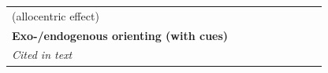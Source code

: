 \documentclass[11pt,]{memoir}
\begin{document}
\begin{longtable}[]{@{}lllllllll@{}}
\begin{minipage}[t]{0.24\columnwidth}
(allocentric effect)\strut
\end{minipage}\tabularnewline
\begin{minipage}[t]{0.12\columnwidth}\raggedright
\textbf{Exo-/endogenous orienting
(with cues)}\strut
\end{minipage} & \begin{minipage}[t]{0.02\columnwidth}\raggedright
\strut
\end{minipage} & \begin{minipage}[t]{0.04\columnwidth}\raggedright
\strut
\end{minipage} & \begin{minipage}[t]{0.11\columnwidth}\raggedright
\strut
\end{minipage} & \begin{minipage}[t]{0.03\columnwidth}\raggedright
\strut
\end{minipage} & \begin{minipage}[t]{0.05\columnwidth}\raggedright
\strut
\end{minipage} & \begin{minipage}[t]{0.05\columnwidth}\raggedright
\strut
\end{minipage} & \begin{minipage}[t]{0.11\columnwidth}\raggedright
\strut
\end{minipage} & \begin{minipage}[t]{0.24\columnwidth}\raggedright
\strut
\end{minipage}\tabularnewline
\begin{minipage}[t]{0.12\columnwidth}\raggedright
\emph{Cited in text}\strut
\end{minipage} & \begin{minipage}[t]{0.02\columnwidth}\raggedright
\strut
\end{minipage} & \begin{minipage}[t]{0.04\columnwidth}\raggedright
\strut
\end{minipage} & \begin{minipage}[t]{0.11\columnwidth}\raggedright
\strut
\end{minipage} & \begin{minipage}[t]{0.03\columnwidth}\raggedright
\strut
\end{minipage} & \begin{minipage}[t]{0.05\columnwidth}\raggedright
\strut
\end{minipage} & \begin{minipage}[t]{0.05\columnwidth}\raggedright
\strut
\end{minipage} & \begin{minipage}[t]{0.11\columnwidth}\raggedright

\end{minipage}
\end{longtable}
\end{document}
